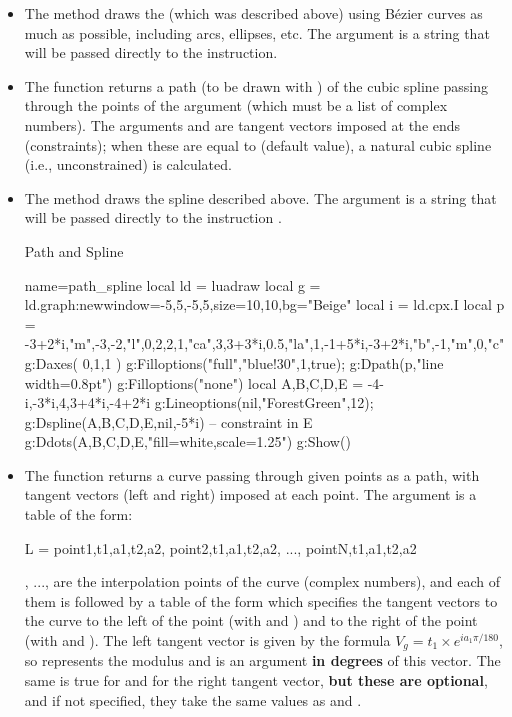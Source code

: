 \begin{itemize}
    \item The  method draws the  (which was described above) using Bézier curves as much as possible, including arcs, ellipses, etc. The  argument is a string that will be passed directly to the \drawcmd instruction.

    \item The function  returns a path (to be drawn with ) of the cubic spline passing through the points of the argument  (which must be a list of complex numbers). The arguments  and  are tangent vectors imposed at the ends (constraints); when these are equal to \nil (default value), a natural cubic spline (i.e., unconstrained) is calculated.

    \item The method  draws the spline described above. The argument  is a string that will be passed directly to the instruction \drawcmd.

\begin{demo}{Path and Spline}
\begin{luadraw}{name=path_spline}
local ld = luadraw
local g = ld.graph:new{window={-5,5,-5,5},size={10,10},bg="Beige"}
local i = ld.cpx.I
local p = {-3+2*i,"m",-3,-2,"l",0,2,2,1,"ca",3,3+3*i,0.5,"la",1,-1+5*i,-3+2*i,"b",-1,"m",0,"c"}
g:Daxes( {0,1,1} )
g:Filloptions("full","blue!30",1,true); g:Dpath(p,"line width=0.8pt")
g:Filloptions("none")
local A,B,C,D,E = -4-i,-3*i,4,3+4*i,-4+2*i
g:Lineoptions(nil,"ForestGreen",12); g:Dspline({A,B,C,D,E},nil,-5*i) -- constraint in E
g:Ddots({A,B,C,D,E},"fill=white,scale=1.25")
g:Show()
\end{luadraw}
\end{demo}

    \item The function  returns a curve passing through given points as a path, with tangent vectors (left and right) imposed at each point. The argument  is a table of the form:
\begin{Luacode}
L = {point1,{t1,a1,t2,a2}, point2,{t1,a1,t2,a2}, ..., pointN,{t1,a1,t2,a2}}
\end{Luacode}
, ...,  are the interpolation points of the curve (complex numbers), and each of them is followed by a table of the form  which specifies the tangent vectors to the curve to the left of the point (with  and ) and to the right of the point (with  and ). The left tangent vector is given by the formula $V_g = t_1\times e^{ia_1\pi/180}$, so  represents the modulus and  is an argument \textbf{in degrees} of this vector. The same is true for  and  for the right tangent vector, \textbf{but these are optional}, and if not specified, they take the same values ​​as  and .


\end{itemize}
